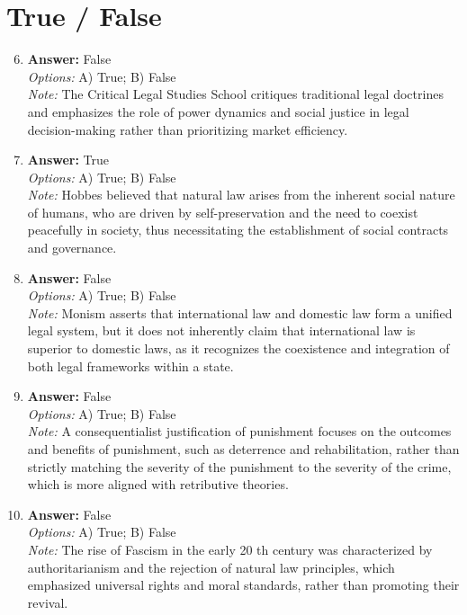 \documentclass[12pt]{article}
\begin{document}
\section*{True / False}
\begin{enumerate}[label=\arabic*.]
\setcounter{enumi}{5}
\item \textbf{Answer:} False
\\ \textit{Options:} A) True; B) False
\\ \textit{Note:} The Critical Legal Studies School critiques traditional legal doctrines and emphasizes the role of power dynamics and social justice in legal decision-making rather than prioritizing market efficiency.
\item \textbf{Answer:} True
\\ \textit{Options:} A) True; B) False
\\ \textit{Note:} Hobbes believed that natural law arises from the inherent social nature of humans, who are driven by self-preservation and the need to coexist peacefully in society, thus necessitating the establishment of social contracts and governance.
\item \textbf{Answer:} False
\\ \textit{Options:} A) True; B) False
\\ \textit{Note:} Monism asserts that international law and domestic law form a unified legal system, but it does not inherently claim that international law is superior to domestic laws, as it recognizes the coexistence and integration of both legal frameworks within a state.
\item \textbf{Answer:} False
\\ \textit{Options:} A) True; B) False
\\ \textit{Note:} A consequentialist justification of punishment focuses on the outcomes and benefits of punishment, such as deterrence and rehabilitation, rather than strictly matching the severity of the punishment to the severity of the crime, which is more aligned with retributive theories.
\item \textbf{Answer:} False
\\ \textit{Options:} A) True; B) False
\\ \textit{Note:} The rise of Fascism in the early 20 th century was characterized by authoritarianism and the rejection of natural law principles, which emphasized universal rights and moral standards, rather than promoting their revival.
\end{enumerate}
\end{document}
